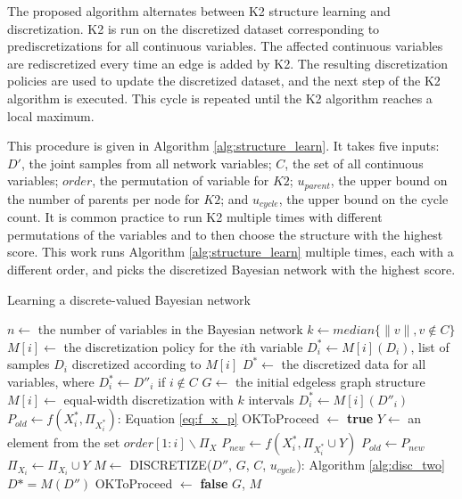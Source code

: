 The proposed algorithm alternates between K2 structure learning and discretization.
K2 is run on the discretized dataset corresponding to prediscretizations for all continuous variables.
The affected continuous variables are rediscretized every time an edge is added by K2.
The resulting discretization policies are used to update the discretized dataset, and the next step of the K2 algorithm is executed.
This cycle is repeated until the K2 algorithm reaches a local maximum.

This procedure is given in Algorithm \ref{alg:structure_learn}.
It takes five inputs: $D'$, the joint samples from all network variables; $C$, the set of all continuous variables; $order$, the permutation of variable for $K2$; $u_{parent}$, the upper bound on the number of parents per node for $K2$; and $u_{cycle}$, the upper bound on the cycle count.
It is common practice to run K2 multiple times with different permutations of the variables and to then choose the structure with the highest score.
This work runs Algorithm \ref{alg:structure_learn} multiple times, each with a different order, and picks the discretized Bayesian network with the highest score.

\begin{algorithm}
\label{alg:structure_learn}
\caption{ Learning a discrete-valued Bayesian network}
\begin{algorithmic}[5]
  \State $n \leftarrow$ the number of variables in the Bayesian network
  \State $k \leftarrow median\{ \|v\|, v\notin C\}$
  \State $M[i] \leftarrow$ the discretization policy for the $i$th variable
  \State $D^*_i \leftarrow M[i] (D_i)$, list of samples $D_i$ discretized according to $M[i]$
  \State $D^* \leftarrow $ the discretized data for all variables, where $D^*_i \leftarrow D''_i$ if $i \notin C$
  \State $G \leftarrow$ the initial edgeless graph structure
  \State
      \State $M[i] \leftarrow$  equal-width discretization with $k$ intervals
      \State $D^*_i \leftarrow  M[i] (D''_i)$
    \EndIf
  \EndFor
  \State
    \State $P_{old} \leftarrow f(X^*_i,\Pi_{X^*_i})$: Equation \ref{eq:f_x_p}
    \State OKToProceed $\leftarrow$ \textbf{true}
      \State $Y \leftarrow$ an element from the set $order[1:i] \backslash \Pi_X$
      \State $P_{new} \leftarrow f(X^*_i,\Pi_{X^*_i} \cup Y)$
        \State $P_{old} \leftarrow P_{new}$
        \State $\Pi_{X_i} \leftarrow \Pi_{X_i} \cup Y $
        \State $M \leftarrow$ {DISCRETIZE}({$D''$, $G$, $C$, $u_{cycle}$}): Algorithm \ref{alg:disc_two}
        \State $D* = M(D'')$
      \Else
        \State OKToProceed $\leftarrow$ \textbf{false}
      \EndIf
    \EndWhile
  \EndFor
  \State \Return $G$, $M$
\EndFunction
\end{algorithmic}
\end{algorithm}

